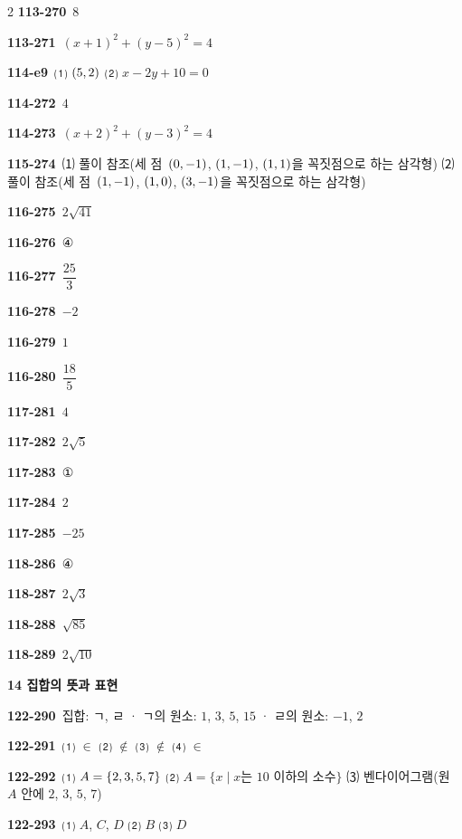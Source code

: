 \documentclass[10pt,a4paper]{article}
\begin{document}
\begin{multicols}{2}
\noindent\textbf{113-270}\ $8$\par
\noindent\textbf{113-271}\ $(x+1)^2+(y-5)^2=4$\par
\noindent\textbf{114-e9}\ ⑴ $(5{,}\mkern3mu\mathopen{}2)$ ⑵ $x-2y+10=0$\par
\noindent\textbf{114-272}\ $4$\par
\noindent\textbf{114-273}\ $(x+2)^2+(y-3)^2=4$\par
\noindent\textbf{115-274}\ ⑴ 풀이 참조(세 점~$(0{,}\mkern3mu\mathopen{}-1)$, $(1{,}\mkern3mu\mathopen{}-1)$, $(1{,}\mkern3mu\mathopen{}1)$을 꼭짓점으로 하는 삼각형) ⑵ 풀이 참조(세 점~$(1{,}\mkern3mu\mathopen{}-1)$, $(1{,}\mkern3mu\mathopen{}0)$, $(3{,}\mkern3mu\mathopen{}-1)$을 꼭짓점으로 하는 삼각형)\par
\noindent\textbf{116-275}\ $2\sqrt{41}$\par
\noindent\textbf{116-276}\ ④\par
\noindent\textbf{116-277}\ $\dfrac{25}{3}$\par
\noindent\textbf{116-278}\ $-2$\par
\noindent\textbf{116-279}\ $1$\par
\noindent\textbf{116-280}\ $\dfrac{18}{5}$\par
\noindent\textbf{117-281}\ $4$\par
\noindent\textbf{117-282}\ $2\sqrt{5}$\par
\noindent\textbf{117-283}\ ①\par
\noindent\textbf{117-284}\ $2$\par
\noindent\textbf{117-285}\ $-25$\par
\noindent\textbf{118-286}\ ④\par
\noindent\textbf{118-287}\ $2\sqrt{3}$\par
\noindent\textbf{118-288}\ $\sqrt{85}$\par
\noindent\textbf{118-289}\ $2\sqrt{10}$\par
\noindent\textbf{14 집합의 뜻과 표현}\par\smallskip
\noindent\textbf{122-290}\ 집합: ㄱ, ㄹ · ㄱ의 원소: $1$, $3$, $5$, $15$ · ㄹ의 원소: $-1$, $2$\par
\noindent\textbf{122-291}\ ⑴ $\in$ ⑵ $\notin$ ⑶ $\notin$ ⑷ $\in$\par
\noindent\textbf{122-292}\ ⑴ $A=\{2{,}\mkern3mu\mathopen{}3{,}\mkern3mu\mathopen{}5{,}\mkern3mu\mathopen{}7\}$ ⑵ $A=\{x \mid x$는 $10$ 이하의 소수$\}$ ⑶ 벤다이어그램(원 $A$ 안에 $2$, $3$, $5$, $7$)\par
\noindent\textbf{122-293}\ ⑴ $A$, $C$, $D$ ⑵ $B$ ⑶ $D$\par

\end{multicols}
\end{document}
